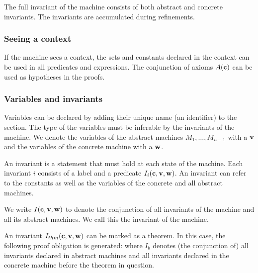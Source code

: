 The full invariant of the machine consists of both abstract and concrete invariants. 
The invariants are accumulated during refinements.


\subsubsection{Seeing a context}
\label{seeing_a_context}
If the machine sees a context, the sets and constants declared in the context can be used in
 all predicates and expressions.
The conjunction of axioms $A(\mathbf{c})$ can be used as hypotheses in the proofs.

\subsubsection{Variables and invariants}
Variables can be declared by adding their unique name (an identifier) to the  section. 
The type of the variables must be inferable by the invariants of the machine.
We denote the variables of the abstract machines $M_1,\ldots,M_{n-1}$ with a $\mathbf{v}$ and the variables of the concrete machine with a $\mathbf{w}$.

An invariant is a statement that must hold at each state of the machine.
Each invariant $i$ consists of a label and a predicate $I_i(\mathbf{c},\mathbf{v},\mathbf{w})$.
An invariant can refer to the constants as well as the variables of the concrete and all abstract machines.

We write $I(\mathbf{c},\mathbf{v},\mathbf{w})$ to denote the conjunction of all invariants
of the machine and all its abstract machines. We call this the invariant of the machine.

An invariant $I_{thm}(\mathbf{c},\mathbf{v},\mathbf{w})$ can be marked as a theorem. In this case, the following proof obligation is generated:
where $I_b$ denotes (the conjunction of) all invariants declared in abstract machines and all invariants declared in the concrete machine before
the theorem in question.

